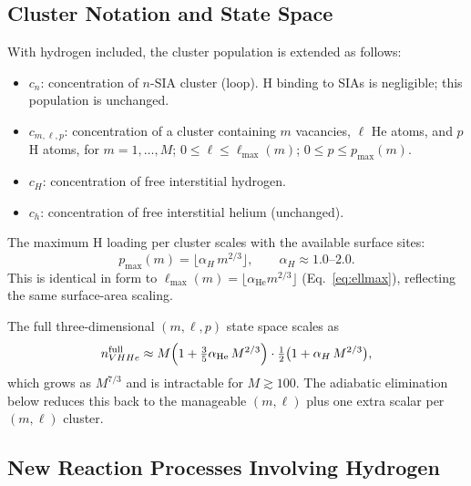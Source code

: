 \subsection{Cluster Notation and State Space}
\label{sec:H_notation}

With hydrogen included, the cluster population is extended as follows:

\begin{itemize}
  \item $c_{n}$: concentration of $n$-SIA cluster (loop).
        H binding to SIAs is negligible; this population is unchanged.
  \item $c_{m,\ell,p}$: concentration of a cluster containing
        $m$ vacancies, $\ell$ He atoms, and $p$ H atoms,
        for $m = 1, \ldots, M$; $0 \leq \ell \leq \ell_{\max}(m)$;
        $0 \leq p \leq p_{\max}(m)$.
  \item $c_H$: concentration of free interstitial hydrogen.
  \item $c_h$: concentration of free interstitial helium (unchanged).
\end{itemize}

The maximum H loading per cluster scales with the available surface sites:
\begin{equation}\label{eq:pmax}
    p_{\max}(m) = \lfloor \alpha_H\,m^{2/3} \rfloor,
    \qquad \alpha_H \approx 1.0\text{--}2.0.
\end{equation}
This is identical in form to $\ell_{\max}(m) = \lfloor \alpha_{\mathrm{He}}
m^{2/3} \rfloor$ (Eq.~\ref{eq:ellmax}), reflecting the same surface-area
scaling.

The full three-dimensional $(m,\ell,p)$ state space scales as
\begin{equation}
    n_{VHHe}^{\mathrm{full}}
    \approx M\Bigl(1 + \tfrac{3}{5}\alpha_{\mathrm{He}}\,M^{2/3}\Bigr)
             \cdot \tfrac{1}{2}\bigl(1 + \alpha_H\,M^{2/3}\bigr),
\end{equation}
which grows as $M^{7/3}$ and is intractable for $M \gtrsim 100$.
The adiabatic elimination below reduces this back to the manageable
$(m,\ell)$ plus one extra scalar per $(m,\ell)$ cluster.

\subsection{New Reaction Processes Involving Hydrogen}
\label{sec:H_reactions}

